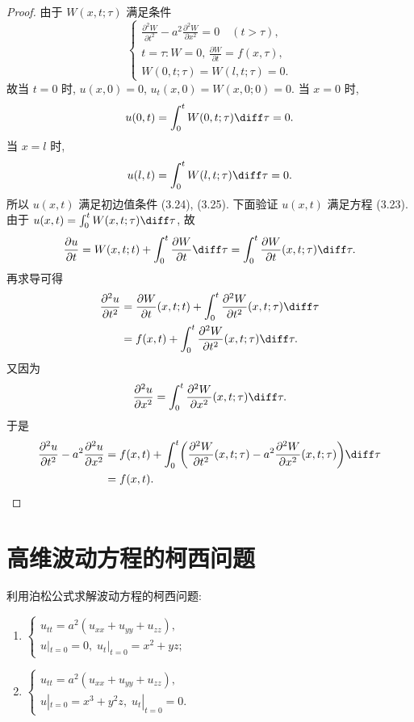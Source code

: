 \begin{proof}
  由于 $W(x,t;\tau)$ 满足条件
  \[\begin{cases}
    \frac{\partial^2W}{\partial t^2} - a^2 \frac{\partial^2W}{\partial x^2} = 0\quad (t>\tau), \\
    t = \tau: W=0,\,\frac{\partial W}{\partial t} = f(x,\tau), \\
    W(0,t;\tau) = W(l,t;\tau) = 0.
  \end{cases}\]
  故当 $t=0$ 时, $u(x,0) = 0$, $u_t(x,0) = W(x,0;0) = 0$.
  当 $x=0$ 时,
  \[u(0, t) = \int_0^t W(0,t;\tau)\diff\tau = 0.\]
  当 $x=l$ 时,
  \[u(l, t) = \int_0^t W(l,t;\tau)\diff\tau = 0.\]
  所以 $u(x,t)$ 满足初边值条件 (3.24), (3.25). 下面验证 $u(x,t)$ 满足方程 (3.23).
  由于 $u(x,t) = \int_0^t W(x,t;\tau)\diff\tau$, 故
  \[\frac{\partial u}{\partial t} = W(x,t;t) + \int_0^t \frac{\partial W}{\partial t}\diff\tau
    = \int_0^t \frac{\partial W}{\partial t}(x,t;\tau)\diff\tau.\]
  再求导可得
  \begin{align*}
    \frac{\partial^2u}{\partial t^2}
    & = \frac{\partial W}{\partial t}(x,t;t)
      + \int_0^t \frac{\partial^2W}{\partial t^2}(x,t;\tau)\diff\tau \\
    & = f(x,t) + \int_0^t \frac{\partial^2W}{\partial t^2}(x,t;\tau)\diff\tau.
  \end{align*}
  又因为
  \[\frac{\partial^2u}{\partial x^2} 
    = \int_0^t \frac{\partial^2W}{\partial x^2}(x,t;\tau)\diff\tau.\]
  于是
  \begin{align*}
    \frac{\partial^2u}{\partial t^2} - a^2 \frac{\partial^2u}{\partial x^2}
    & = f(x,t) + \int_0^t \biggl(\frac{\partial ^2W}{\partial t^2}(x,t;\tau)
      - a^2 \frac{\partial^2W}{\partial x^2}(x,t;\tau)\biggr)\diff\tau \\
    & = f(x,t).\qedhere
  \end{align*}
\end{proof}


\section{高维波动方程的柯西问题}

\begin{exercise}
  利用泊松公式求解波动方程的柯西问题:
  \begin{enumerate}[(1)]
    \item $\begin{cases}
            u_{tt} = a^2(u_{xx}+u_{yy}+u_{zz}), \\
            u|_{t=0}=0,\; u_t|_{t=0}=x^2+yz;
          \end{cases}$
    \item $\begin{cases}
            u_{tt} = a^2(u_{xx}+u_{yy}+u_{zz}), \\
            u|_{t=0}=x^3+y^2z,\; u_t|_{t=0}=0.
           \end{cases}$
  \end{enumerate}
\end{exercise}

